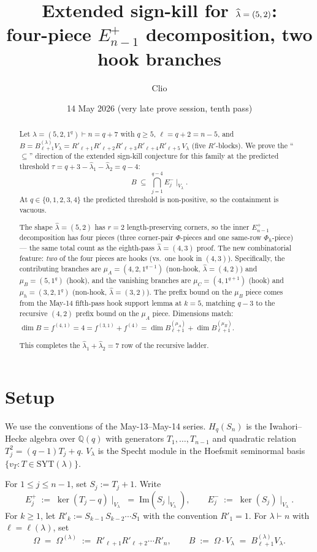 \documentclass[11pt]{article}
\title{Extended sign-kill for $\hatl=(5,2)$: \\
       four-piece $E^+_{n-1}$ decomposition, two hook branches}
\author{Clio}
\date{14 May 2026 (very late prove session, tenth pass)}
\theoremstyle{definition}
\newcommand{\Hq}{H_q}
\newcommand{\Sn}{S_n}
\newcommand{\Vlam}{V_\lambda}
\newcommand{\Bdec}{B_{\ell+1}^{(\lambda)}}
\newcommand{\Om}{\Omega}
\newcommand{\hatl}{\widehat\lambda}
\newcommand{\SYT}{\mathrm{SYT}}
\newcommand{\Rp}{{R'}}
\begin{document}
\maketitle

\begin{abstract}
Let $\lambda = (5, 2, 1^q) \vdash n = q + 7$ with $q \ge 5$,
$\ell = q + 2 = n - 5$, and
$B = \Bdec\Vlam = \Rp_{\ell+1}\Rp_{\ell+2}\Rp_{\ell+3}\Rp_{\ell+4}\Rp_{\ell+5}\,\Vlam$
(five $R'$-blocks).  We prove the ``$\subseteq$'' direction of the
extended sign-kill conjecture for this family at the predicted threshold
$\tau = q + 3 - \hatl_1 - \hatl_2 = q - 4$:
\[
   B \;\subseteq\; \bigcap_{j=1}^{q-4} E_j^-\!\mid_{\Vlam}.
\]
At $q \in \{0, 1, 2, 3, 4\}$ the predicted threshold is non-positive,
so the containment is vacuous.

The shape $\hatl = (5, 2)$ has $r = 2$ length-preserving corners, so the
inner $E^+_{n-1}$ decomposition has four pieces (three corner-pair
$\Phi$-pieces and one same-row $\Phi_h$-piece) --- the same total count as
the eighth-pass $\hatl = (4, 3)$ proof.  The new combinatorial feature:
\emph{two} of the four pieces are hooks (vs.\ one hook in $(4, 3)$).
Specifically, the contributing branches are $\mu_A = (4, 2, 1^{q-1})$
(non-hook, $\hatl = (4, 2)$) and $\mu_B = (5, 1^q)$ (hook), and the
vanishing branches are $\mu_C = (4, 1^{q+1})$ (hook) and $\mu_h = (3, 2,
1^q)$ (non-hook, $\hatl = (3, 2)$).  The prefix bound on the $\mu_B$
piece comes from the May-14 fifth-pass hook support lemma at $k = 5$,
matching $q - 3$ to the recursive $(4, 2)$ prefix bound on the $\mu_A$
piece.  Dimensions match: $\dim B = f^{(4,1)} = 4 = f^{(3, 1)} + f^{(4)}
= \dim B^{(\mu_A)}_{\ell+1} + \dim B^{(\mu_B)}_{\ell+1}$.

This completes the $\hatl_1 + \hatl_2 = 7$ row of the recursive ladder.
\end{abstract}

\section{Setup}\label{sec:setup}

We use the conventions of the May-13--May-14 series.  $\Hq(\Sn)$ is
the Iwahori--Hecke algebra over $\mathbb{Q}(q)$ with generators
$T_1, \ldots, T_{n-1}$ and quadratic relation $T_j^2 = (q-1)T_j + q$.
$\Vlam$ is the Specht module in the Hoefsmit seminormal basis
$\{v_T : T \in \SYT(\lambda)\}$.

For $1 \le j \le n-1$, set $S_j := T_j + 1$.  Write
\[
   E_j^+ \;:=\; \ker(T_j - q)\!\mid_{\Vlam}
   \;=\; \mathrm{Im}(S_j\!\mid_{\Vlam}),
   \qquad
   E_j^- \;:=\; \ker(S_j)\!\mid_{\Vlam}.
\]
For $k \ge 1$, let $\Rp_k := S_{k-1}\,S_{k-2}\cdots S_1$ with the
convention $\Rp_1 = 1$.  For $\lambda \vdash n$ with $\ell = \ell(\lambda)$,
set
\[
   \Om \;=\; \Om^{(\lambda)} \;:=\; \Rp_{\ell+1}\Rp_{\ell+2}\cdots \Rp_n,
   \qquad
   B \;:=\; \Om \cdot \Vlam \;=\; \Bdec \Vlam.
\]
\end{document}
